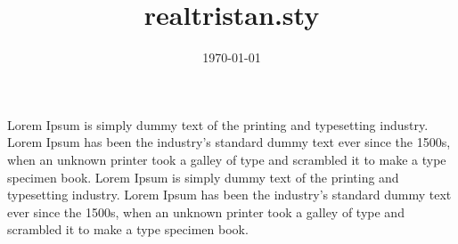 \documentclass{article}
\title{realtristan.sty}
\author{\email{heytristaann@gmail.com}}
\date{\today}
\begin{document}
\maketitle
{} {
	\flex{}{
		\lalign*{
			& \kina{} \\\\
			& \kinb{} \\\\
			& \kinc{} \\\\
			& \kind{} \\\\
			& \kine{} \\
		}
	}
}
 {
	Lorem Ipsum is simply dummy text of the printing and typesetting industry. Lorem Ipsum has been the industry's standard dummy text ever since the 1500s, when an unknown printer took a galley of type and scrambled it to make a type specimen book.
	\malign*{
		\therefore \kina{}
	}
}
 {
	Lorem Ipsum is simply dummy text of the printing and typesetting industry. Lorem Ipsum has been the industry's standard dummy text ever since the 1500s, when an unknown printer took a galley of type and scrambled it to make a type specimen book.
	\lalign{
		\therefore \kinb{}
	}
}
\end{document}
